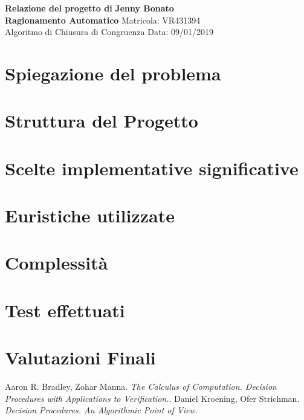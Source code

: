 \documentclass[a4paper, 11pt]{article}
\begin{document}
\noindent
\large\textbf{Relazione del progetto di} \hfill \textbf{Jenny Bonato} \\
\large\textbf{Ragionamento Automatico} \hfill Matricola: VR431394 \\
Algoritmo di Chiusura di Congruenza \hfill Data: 09/01/2019 \\

\section*{Spiegazione del problema}

\section*{Struttura del Progetto}

\section*{Scelte implementative significative}

\section*{Euristiche utilizzate}

\section*{Complessità}

\section*{Test effettuati}

\section*{Valutazioni Finali}

\begin{thebibliography}{2}
 Aaron R. Bradley, Zohar Manna. \emph{The Calculus of Computation. Decision Procedures with Applications to Verification.}.
  Daniel Kroening, Ofer Strichman. \emph{Decision Procedures. An Algorithmic Point of View}.
\end{thebibliography}
\end{document}
